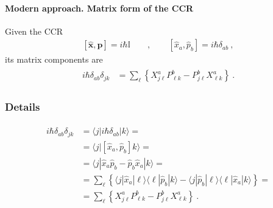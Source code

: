 \documentclass[letterpaper,10pt,english]{jupyterBook}
\begin{document}
\paragraph{Modern approach. Matrix form of the CCR}
\label{\detokenize{ch/quantum-mechanics/history/heisenberg-reinterpretation:modern-approach-matrix-form-of-the-ccr}}\label{\detokenize{ch/quantum-mechanics/history/heisenberg-reinterpretation:quantum-mechanics-history-heisenberg-reinterpretation-ccr-quantization-rule-matrix}}
\sphinxAtStartPar
Given the CCR
\begin{equation*}
\begin{split}\left[ \hat{\mathbf{x}}, \hat{\mathbf{p}} \right] = i \hbar \mathbb{I} \qquad , \qquad \left[ \hat{x}_a, \hat{p}_b \right] = i \hbar \delta_{ab} \ ,\end{split}
\end{equation*}
\sphinxAtStartPar
its matrix components are
\begin{equation}\label{equation:ch/quantum-mechanics/history/heisenberg-reinterpretation:eq:qm:heisenberg:ccr-matrix}
\begin{split}\begin{aligned}
  i \hbar \delta_{ab} \delta_{jk} 
  & = \sum_{\ell} \left\{ X^{a}_{j \ell} P^{b}_{\ell k} - P^{b}_{j \ell} X^{a}_{\ell k} \right\} \ .
\end{aligned}\end{split}
\end{equation}\subsubsection*{Details}
\begin{equation*}
\begin{split}\begin{aligned}
  i \hbar \delta_{ab} \delta_{jk} 
  & = \langle j | i \hbar \delta_{ab} | k \rangle = \\
  & = \langle j | \left[ \hat{x}_a , \hat{p}_b \right] k \rangle = \\
  & = \langle j | \hat{x}_a \hat{p}_b - \hat{p}_b \hat{x}_a | k \rangle = \\
  & = \sum_{\ell} \left\{ \langle j | \hat{x}_a | \ell \rangle \langle \ell | \hat{p}_b | k \rangle - \langle j | \hat{p}_b | \ell \rangle \langle \ell | \hat{x}_a | k \rangle \right\} = \\
  & = \sum_{\ell} \left\{ X^{a}_{j \ell} P^{b}_{\ell k} - P^{b}_{j \ell} X^{a}_{\ell k} \right\} \ .
\end{aligned}\end{split}
\end{equation*}
\end{document}
